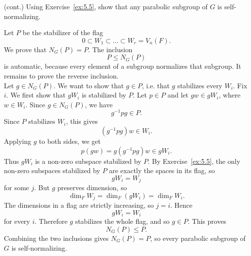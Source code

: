 \documentclass[../Odyssey_Project.tex]{subfiles}
\begin{document}
\begin{exercise}
\label{ex:5.6}
(cont.) Using Exercise~\ref{ex:5.5}, show that any parabolic subgroup of $G$ is self-normalizing.
\end{exercise}
\begin{solution}
Let $P$ be the stabilizer of the flag
\[
    0\subset W_1\subset \dots\subset W_r=V_n(F).
\]
We prove that $N_G(P)=P$. The inclusion
\[
    P\leq N_G(P)
\]
is automatic, because every element of a subgroup normalizes that subgroup. It remains to prove the reverse inclusion.\\
Let $g\in N_G(P)$. We want to show that $g\in P$, i.e. that $g$ stabilizes every $W_i$. Fix $i$. We first show that $gW_i$ is stabilized by $P$. Let $p\in P$ and let $gw\in gW_i$, where $w\in W_i$. Since $g\in N_G(P)$, we have
\[
    g^{-1}pg\in P.
\]
Since $P$ stabilizes $W_i$, this gives
\[
    (g^{-1}pg)w\in W_i.
\]
Applying $g$ to both sides, we get
\[
    p(gw)=g(g^{-1}pg)w\in gW_i.
\]
Thus $gW_i$ is a non-zero subspace stabilized by $P$. By Exercise~\ref{ex:5.5}, the only non-zero subspaces stabilized by $P$ are exactly the spaces in its flag, so
\[
    gW_i=W_j
\]
for some $j$. But $g$ preserves dimension, so
\[
    \dim_F W_j=\dim_F(gW_i)=\dim_F W_i.
\]
The dimensions in a flag are strictly increasing, so $j=i$. Hence
\[
    gW_i=W_i
\]
for every $i$. Therefore $g$ stabilizes the whole flag, and so $g\in P$. This proves
\[
    N_G(P)\leq P.
\]
Combining the two inclusions gives $N_G(P)=P$, so every parabolic subgroup of $G$ is self-normalizing.
\end{solution}
\end{document}
